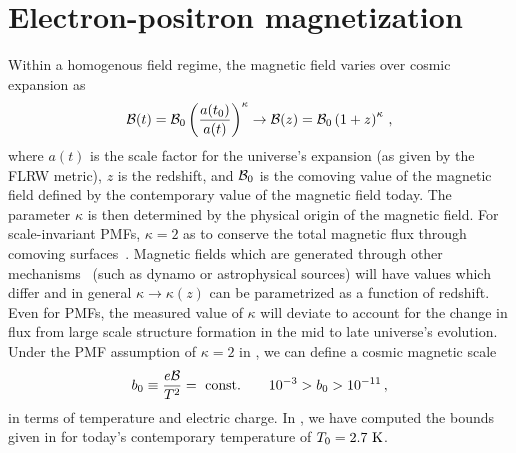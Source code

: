 \documentclass[a4paper]{article}
\begin{document}
\section{Electron-positron magnetization}\label{sec:ElectronPositron}
\noindent Within a homogenous field regime, the magnetic field varies over cosmic expansion as
\begin{align}
    \label{cosmicscale}
    {\cal B}(t)={\cal B}_{0}\left(\frac{a(t_0)}{a(t)}\right)^{\kappa}\rightarrow{\cal B}(z)={\cal B}_{0}\left(1+z\right)^{\kappa}\,,
\end{align}
where $a(t)$ is the scale factor for the universe's expansion (as given by the FLRW metric), $z$ is the redshift, and ${\cal B}_{0}$ is the comoving value of the magnetic field defined by the contemporary value of the magnetic field today. The parameter $\kappa$ is then determined by the physical origin of the magnetic field. For scale-invariant PMFs, $\kappa=2$ as to conserve the total magnetic flux through comoving surfaces~\cite{durrer2013cosmological}. Magnetic fields which are generated through other mechanisms~\cite{pomakov2022redshift} (such as dynamo or astrophysical sources) will have values which differ and in general $\kappa\rightarrow\kappa(z)$ can be parametrized as a function of redshift. Even for PMFs, the measured value of $\kappa$ will deviate to account for the change in flux from large scale structure formation in the mid to late universe's evolution. Under the PMF assumption of $\kappa=2$ in , we can define a cosmic magnetic scale
\begin{align}
    \label{magneticscale}
    b_{0}\equiv\frac{e{\cal B}}{T^{2}}={\rm\ const.}\qquad10^{-3}>b_{0}>10^{-11}\,,
\end{align}
in terms of temperature and electric charge. In , we have computed the bounds given in  for today's contemporary temperature of $T_{0}=2.7{\rm\ K}$.
\end{document}
